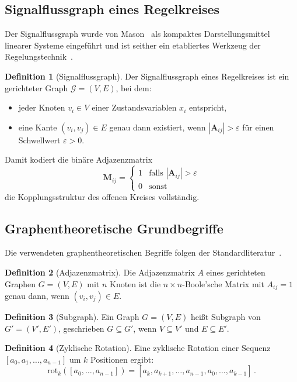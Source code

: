 \documentclass[a4paper,12pt]{article}
\theoremstyle{definition}
\newtheorem{definition}{Definition}
\begin{document}
\subsection{Signalflussgraph eines Regelkreises}

Der Signalflussgraph wurde von Mason~\cite{mason} als kompaktes Darstellungsmittel
linearer Systeme eingeführt und ist seither ein etabliertes Werkzeug der
Regelungstechnik~\cite{ogata,lunze}.

\begin{definition}[Signalflussgraph]
Der Signalflussgraph eines Regelkreises ist ein gerichteter Graph
$\mathcal{G} = (V, E)$, bei dem:
\begin{itemize}
    \item jeder Knoten $v_i \in V$ einer Zustandsvariablen $x_i$ entspricht,
    \item eine Kante $(v_i, v_j) \in E$ genau dann existiert, wenn
          $|\mathbf{A}_{ij}| > \varepsilon$ für einen Schwellwert $\varepsilon > 0$.
\end{itemize}
\end{definition}

Damit kodiert die binäre Adjazenzmatrix
\[
\mathbf{M}_{ij} = \begin{cases} 1 & \text{falls } |\mathbf{A}_{ij}| > \varepsilon \\ 0 & \text{sonst} \end{cases}
\]
die Kopplungsstruktur des offenen Kreises vollständig.

\subsection{Graphentheoretische Grundbegriffe}

Die verwendeten graphentheoretischen Begriffe folgen der Standardliteratur~\cite{diestel,cormen}.

\begin{definition}[Adjazenzmatrix]
Die Adjazenzmatrix $A$ eines gerichteten Graphen $G = (V,E)$ mit $n$ Knoten ist
die $n \times n$-Boole'sche Matrix mit $A_{ij} = 1$ genau dann, wenn $(v_i, v_j) \in E$.
\end{definition}

\begin{definition}[Subgraph]
Ein Graph $G = (V, E)$ heißt Subgraph von $G' = (V', E')$,
geschrieben $G \subseteq G'$, wenn $V \subseteq V'$ und $E \subseteq E'$.
\end{definition}

\begin{definition}[Zyklische Rotation]
Eine zyklische Rotation einer Sequenz $[a_0, a_1, \ldots, a_{n-1}]$ um $k$ Positionen
ergibt:
\[
\mathrm{rot}_k([a_0, \ldots, a_{n-1}]) = [a_k, a_{k+1}, \ldots, a_{n-1}, a_0, \ldots, a_{k-1}] \,.
\]
\end{definition}
\end{document}
